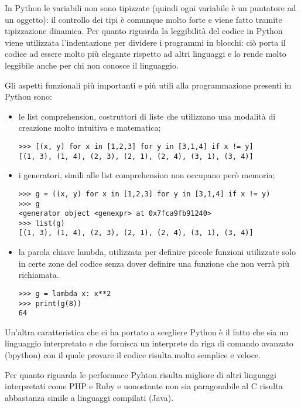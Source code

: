 \documentclass[12pt]{report}
\begin{document}
In Python le variabili non sono tipizzate (quindi ogni variabile è un puntatore ad un oggetto): il controllo dei tipi è comunque molto forte e viene fatto tramite tipizzazione dinamica.
Per quanto riguarda la leggibilità del codice in Python viene utilizzata l'indentazione per dividere i programmi in blocchi: ciò porta il codice ad essere molto più elegante rispetto ad altri linguaggi e lo rende molto leggibile anche per chi non conosce il linguaggio.

Gli aspetti funzionali più importanti e più utili alla programmazione presenti in Python sono:
\begin{itemize}
\item le list comprehension, costruttori di liste che utilizzano una modalità di creazione molto intuitiva e matematica;
\begin{lstlisting}[label=codice,caption=Esempio di List Comprehension]
>>> [(x, y) for x in [1,2,3] for y in [3,1,4] if x != y]
[(1, 3), (1, 4), (2, 3), (2, 1), (2, 4), (3, 1), (3, 4)] 
\end{lstlisting}
\item i generatori, simili alle list comprehension non occupano però memoria;
\begin{lstlisting}[label=codice,caption=Esempio di Generatore]
>>> g = ((x, y) for x in [1,2,3] for y in [3,1,4] if x != y)
>>> g
<generator object <genexpr> at 0x7fca9fb91240>
>>> list(g)
[(1, 3), (1, 4), (2, 3), (2, 1), (2, 4), (3, 1), (3, 4)]
\end{lstlisting}
\item la parola chiave lambda, utilizzata per definire piccole funzioni utilizzate solo in certe zone del codice senza dover definire una funzione che non verrà più richiamata.
\begin{lstlisting}[label=codice,caption=Esempio di utlizzo della lambda]
>>> g = lambda x: x**2
>>> print(g(8))
64
\end{lstlisting}
\end{itemize}  
 
Un'altra caratteristica che ci ha portato a scegliere Python è il fatto che sia un linguaggio interpretato e che fornisca un interprete da riga di comando avanzato (bpython) con il quale provare il codice risulta molto semplice e veloce. 

Per quanto riguarda le performace Pyhton risulta migliore di altri linguaggi interpretati come PHP e Ruby e nonostante non sia paragonabile al C risulta abbastanza simile a linguaggi compilati (Java).
\end{document}
